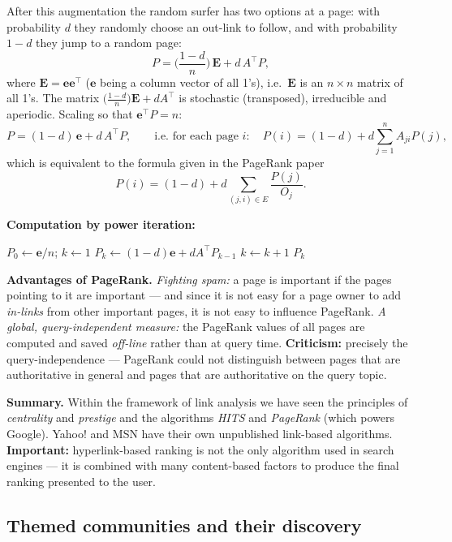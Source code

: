\documentclass[11pt,a4paper]{article}
\theoremstyle{definition}
\begin{document}
\begin{defbox}
After this augmentation the random surfer has two options at a page: with probability $d$ they
randomly choose an out-link to follow, and with probability $1-d$ they jump to a random page:
\[ P=\Big(\frac{1-d}{n}\Big)\,\mathbf{E}+d\,A^{\!\top}P, \]
where $\mathbf E=\mathbf{ee}^{\!\top}$ ($\mathbf e$ being a column vector of all 1's), i.e.\
$\mathbf E$ is an $n\times n$ matrix of all 1's. The matrix
$\big(\frac{1-d}{n}\big)\mathbf E+dA^{\!\top}$ is stochastic (transposed), irreducible and
aperiodic. Scaling so that $\mathbf e^{\!\top}P=n$:
\[ P=(1-d)\,\mathbf e+d\,A^{\!\top}P,\qquad\text{i.e.\ for each page } i: \quad
   P(i)=(1-d)+d\sum_{j=1}^{n}A_{ji}P(j), \]
which is equivalent to the formula given in the PageRank paper
\[ P(i)=(1-d)+d\sum_{(j,i)\in E}\frac{P(j)}{O_j}. \]

\textbf{Computation by power iteration:}
\begin{algorithmic}[1]
\State $P_0\gets \mathbf e/n$; $k\gets 1$
\Repeat
  \State $P_k\gets (1-d)\mathbf e+dA^{\!\top}P_{k-1}$
  \State $k\gets k+1$
\State \Return $P_k$
\end{algorithmic}
\end{defbox}

\textbf{Advantages of PageRank.} \emph{Fighting spam:} a page is important if the pages pointing to it
are important --- and since it is not easy for a page owner to add \emph{in-links} from other
important pages, it is not easy to influence PageRank. \emph{A global, query-independent measure:} the
PageRank values of all pages are computed and saved \emph{off-line} rather than at query time.
\textbf{Criticism:} precisely the query-independence --- PageRank could not distinguish between pages
that are authoritative in general and pages that are authoritative on the query topic.

\textbf{Summary.} Within the framework of link analysis we have seen the principles of
\emph{centrality} and \emph{prestige} and the
algorithms \emph{HITS} and \emph{PageRank} (which powers Google). Yahoo! and MSN have their own
unpublished link-based algorithms. \textbf{Important:} hyperlink-based ranking is not the only
algorithm used in search engines --- it is combined with many content-based factors to produce the
final ranking presented to the user.

\subsection{Themed communities and their discovery}
\end{document}
